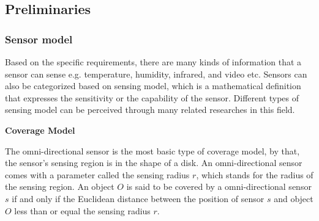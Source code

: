 \documentclass[final]{elsarticle}
\begin{document}
\subsection{Preliminaries}

\subsubsection{Sensor model}

Based on the specific requirements, there are many kinds of information that a sensor can sense e.g. temperature, humidity, infrared, and video etc. Sensors can also be categorized based on sensing model, which is a mathematical definition that expresses the sensitivity or the capability of the sensor. Different types of sensing model can be perceived through many related researches in this field.

\textbf{Coverage Model}

The omni-directional sensor is the most basic type of coverage model, by that, the sensor's sensing region is in the shape of a disk. An omni-directional sensor comes with a parameter called the sensing radius $r$, which stands for the radius of the sensing region. An object $ O $ is said to be covered by a omni-directional sensor $ s $ if and only if the Euclidean distance between the position of sensor $s$ and object $ O $ less than or equal the sensing radius $r$.
\end{document}

